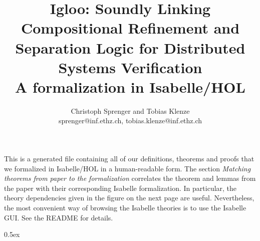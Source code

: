 \documentclass[11pt,a4paper]{report}
\begin{document}
\title{Igloo: Soundly Linking Compositional Refinement and
Separation Logic for Distributed Systems Verification\\
A formalization in Isabelle/HOL}
\author{Christoph Sprenger and Tobias Klenze\\
\footnotesize sprenger@inf.ethz.ch, tobias.klenze@inf.ethz.ch}

\maketitle

\tableofcontents

\newpage

This is a generated file containing all of our definitions, theorems and proofs that we formalized in Isabelle/HOL in a human-readable form. 
The section \emph{Matching theorems from paper to the formalization} correlates the theorem and lemmas from the paper with their corresponding Isabelle formalization.
In particular, the theory dependencies given in the figure on the next page are useful.
Nevertheless, the most convenient way of browsing the Isabelle theories is to use the Isabelle GUI. See the README for details.

\parindent 0pt\parskip 0.5ex





%
%
\end{document}

